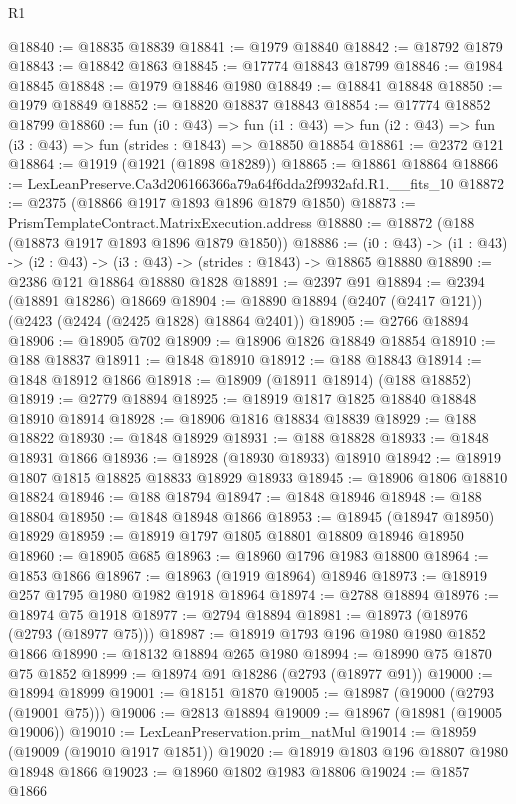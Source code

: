 \begin{lexlean}{R1}
\begin{coremodule}
@18840 := @18835 @18839
@18841 := @1979 @18840
@18842 := @18792 @1879
@18843 := @18842 @1863
@18845 := @17774 @18843 @18799
@18846 := @1984 @18845
@18848 := @1979 @18846 @1980
@18849 := @18841 @18848
@18850 := @1979 @18849
@18852 := @18820 @18837 @18843
@18854 := @17774 @18852 @18799
@18860 := fun (i0 : @43) =>
  fun (i1 : @43) => fun (i2 : @43) => fun (i3 : @43) => fun (strides : @1843) => @18850 @18854
@18861 := @2372 @121
@18864 := @1919 (@1921 (@1898 @18289))
@18865 := @18861 @18864
@18866 := LexLeanPreserve.Ca3d206166366a79a64f6dda2f9932afd.R1.__fits_10
@18872 := @2375 (@18866 @1917 @1893 @1896 @1879 @1850)
@18873 := PrismTemplateContract.MatrixExecution.address
@18880 := @18872 (@188 (@18873 @1917 @1893 @1896 @1879 @1850))
@18886 := (i0 : @43) -> (i1 : @43) -> (i2 : @43) -> (i3 : @43) -> (strides : @1843) -> @18865 @18880
@18890 := @2386 @121 @18864 @18880 @1828
@18891 := @2397 @91
@18894 := @2394 (@18891 @18286) @18669
@18904 := @18890 @18894 (@2407 (@2417 @121)) (@2423 (@2424 (@2425 @1828) @18864 @2401))
@18905 := @2766 @18894
@18906 := @18905 @702
@18909 := @18906 @1826 @18849 @18854
@18910 := @188 @18837
@18911 := @1848 @18910
@18912 := @188 @18843
@18914 := @1848 @18912 @1866
@18918 := @18909 (@18911 @18914) (@188 @18852)
@18919 := @2779 @18894
@18925 := @18919 @1817 @1825 @18840 @18848 @18910 @18914
@18928 := @18906 @1816 @18834 @18839
@18929 := @188 @18822
@18930 := @1848 @18929
@18931 := @188 @18828
@18933 := @1848 @18931 @1866
@18936 := @18928 (@18930 @18933) @18910
@18942 := @18919 @1807 @1815 @18825 @18833 @18929 @18933
@18945 := @18906 @1806 @18810 @18824
@18946 := @188 @18794
@18947 := @1848 @18946
@18948 := @188 @18804
@18950 := @1848 @18948 @1866
@18953 := @18945 (@18947 @18950) @18929
@18959 := @18919 @1797 @1805 @18801 @18809 @18946 @18950
@18960 := @18905 @685
@18963 := @18960 @1796 @1983 @18800
@18964 := @1853 @1866
@18967 := @18963 (@1919 @18964) @18946
@18973 := @18919 @257 @1795 @1980 @1982 @1918 @18964
@18974 := @2788 @18894
@18976 := @18974 @75 @1918
@18977 := @2794 @18894
@18981 := @18973 (@18976 (@2793 (@18977 @75)))
@18987 := @18919 @1793 @196 @1980 @1980 @1852 @1866
@18990 := @18132 @18894 @265 @1980
@18994 := @18990 @75 @1870 @75 @1852
@18999 := @18974 @91 @18286 (@2793 (@18977 @91))
@19000 := @18994 @18999
@19001 := @18151 @1870
@19005 := @18987 (@19000 (@2793 (@19001 @75)))
@19006 := @2813 @18894
@19009 := @18967 (@18981 (@19005 @19006))
@19010 := LexLeanPreservation.prim_natMul
@19014 := @18959 (@19009 (@19010 @1917 @1851))
@19020 := @18919 @1803 @196 @18807 @1980 @18948 @1866
@19023 := @18960 @1802 @1983 @18806
@19024 := @1857 @1866

\end{coremodule}
\end{lexlean}
